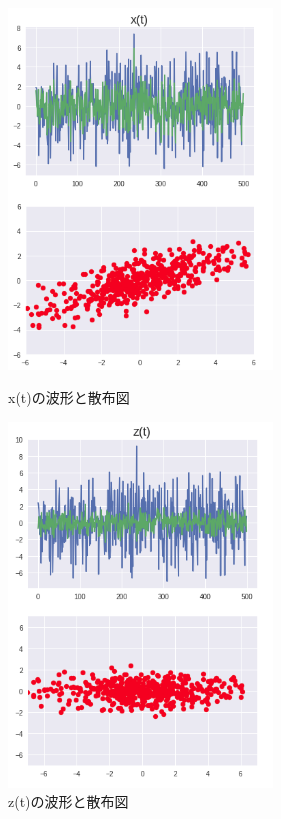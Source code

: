 \begin{figure}[t]
    \begin{minipage}{0.5\hsize}
     \begin{center}
      \includegraphics[width=70mm]{images/x(t).png}
     \end{center}
     \caption{x(t)の波形と散布図}
     \label{fig:x(t)}
    \end{minipage}
    \begin{minipage}{0.5\hsize}
     \begin{center}
      \includegraphics[width=70mm]{images/z(t).png}
     \end{center}
     \caption{z(t)の波形と散布図}
     \label{fig:z(t)}
    \end{minipage}
\end{figure}
